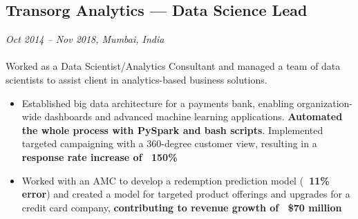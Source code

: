 \subsection*{Transorg Analytics — Data Science Lead}
\textit{Oct 2014 – Nov 2018, Mumbai, India}
\\
\\
Worked as a Data Scientist/Analytics Consultant and managed a team of data scientists to assist client in analytics-based business solutions.
\begin{itemize}[leftmargin=1em]
    \item Established big data architecture for a payments bank, enabling organization-wide dashboards and advanced machine learning applications. \textbf{Automated the whole process with PySpark and bash scripts}. Implemented targeted campaigning with a 360-degree customer view, resulting in a \textbf{response rate increase of ~150\%}
    \item Worked with an AMC to develop a redemption prediction model (\textbf{~11\% error}) and created a model for targeted product offerings and upgrades for a credit card company, \textbf{contributing to revenue growth of ~\$70 million}
\end{itemize}
